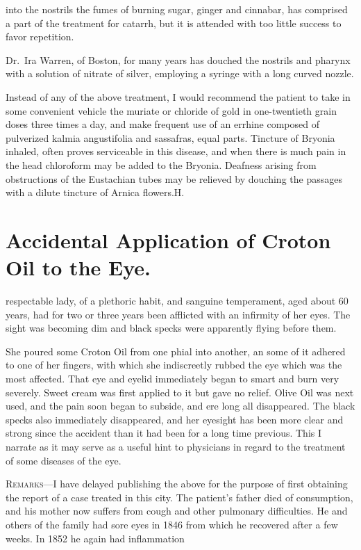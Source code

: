 into the nostrils the fumes of burning sugar, ginger and cinnabar,
has comprised a part of the treatment for catarrh, but it is attended
with too little success to favor repetition.

Dr.\ Ira Warren, of Boston, for many years has douched the nostrils
and pharynx with a solution of nitrate of silver, employing a syringe
with a long curved nozzle.

Instead of any of the above treatment, I would recommend the patient
to take in some convenient vehicle the muriate or chloride of gold
in one-twentieth grain doses three times a day, and make frequent use
of an errhine composed of pulverized kalmia angustifolia and sassafras,
equal parts. Tincture of Bryonia inhaled, often proves serviceable in
this disease, and when there is much pain in the head chloroform may
be added to the Bryonia. Deafness arising from obstructions of the
Eustachian tubes may be relieved by douching the passages with a dilute
tincture of Arnica flowers.\hfill{}H.{}

\arrowbulletornament
\section*{Accidental Application of Croton Oil to the Eye.}


 respectable lady, of a plethoric habit, and sanguine temperament,
aged about 60 years, had for two or three years been afflicted
with an infirmity of her eyes. The sight was becoming dim and black
specks were apparently flying before them.

She poured some Croton Oil from one phial into another, an some
of it adhered to one of her fingers, with which she indiscreetly rubbed
the eye which was the most affected. That eye and eyelid immediately
began to smart and burn very severely. Sweet cream was first applied
to it but gave no relief. Olive Oil was next used, and the pain soon began
to subside, and ere long all disappeared. The black specks also immediately
disappeared, and her eyesight has been more clear and strong
since the accident than it had been for a long time previous. This I narrate
as it may serve as a useful hint to physicians in regard to the treatment
of some diseases of the eye.

\textsc{Remarks}---I have delayed publishing the above for the purpose of first
obtaining the report of a case treated in this city. The patient's father
died of consumption, and his mother now suffers from cough and other
pulmonary difficulties. He and others of the family had sore eyes in 1846
from which he recovered after a few weeks. In 1852 he again had inflammation\endinput
